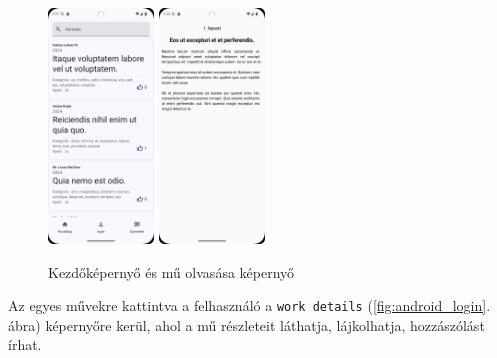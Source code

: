 \begin{figure}[H]
    \centering
    \includegraphics[width=0.25\textwidth]{figures/android_home.png}
    \includegraphics[width=0.25\textwidth]{figures/android_read.png}
    \caption{Kezdőképernyő és mű olvasása képernyő}
    \label{fig:android_home}
\end{figure}

Az egyes művekre kattintva a felhasználó a \texttt{work details} (\ref{fig:android_login}. ábra) képernyőre kerül, ahol a mű részleteit láthatja,
lájkolhatja, hozzászólást írhat.

